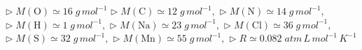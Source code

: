 \documentclass[a4paper,addpoints,14pt]{exam}
\newcommand*\chem[1]{\ensuremath{\mathrm{#1}}}
\newcommand{\halmos}{\vspace*{-6mm}
	
					\begin{flushright}
						\rule{1mm}{2.5mm} 
					\end{flushright}
					\vspace*{-4mm}
						
					  }
\renewcommand{\qed}{\halmos}
\begin{document}


\vspace*{\fill}

\begin{learn}
{$\triangleright\; M(\chem{O})\simeq16\;g\,mol^{-1}$\newline
$\triangleright\; M(\chem{C})\simeq12\;g\,mol^{-1},$\newline
$\triangleright\; M(\chem{N})\simeq14\;g\,mol^{-1},$\newline
$\triangleright\; M(\chem{H})\simeq1\;g\,mol^{-1},$\newline
$\triangleright\; M(\chem{Na})\simeq 23\;g\,mol^{-1},$\newline
$\triangleright\; M(\chem{Cl})\simeq 36\;g\,mol^{-1},$\newline
$\triangleright\; M(\chem{S})\simeq32\;g\,mol^{-1},$\newline
$\triangleright\; M(\chem{Mn})\simeq55\;g\,mol^{-1},$\newline
$\triangleright\; R\simeq 0.082\;atm\,L\,mol^{-1}\,K^{-1}$
}
\end{learn}	
		

\newpage
{}
\end{document}
